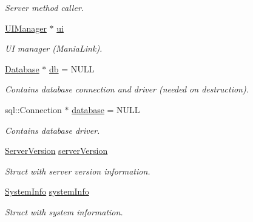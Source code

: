 \begin{DoxyCompactItemize}
\begin{DoxyCompactList}\small\item\em Server method caller. \end{DoxyCompactList}\item 
\hypertarget{classManiaPP_a961146c15f25d19ffc78b3e79ad4abac}{\hyperlink{classUIManager}{U\-I\-Manager} $\ast$ \hyperlink{classManiaPP_a961146c15f25d19ffc78b3e79ad4abac}{ui}}\label{classManiaPP_a961146c15f25d19ffc78b3e79ad4abac}

\begin{DoxyCompactList}\small\item\em U\-I manager (Mania\-Link). \end{DoxyCompactList}\item 
\hypertarget{classManiaPP_a4239002fe32663b70f0f875f41b57cbc}{\hyperlink{classDatabase}{Database} $\ast$ \hyperlink{classManiaPP_a4239002fe32663b70f0f875f41b57cbc}{db} = N\-U\-L\-L}\label{classManiaPP_a4239002fe32663b70f0f875f41b57cbc}

\begin{DoxyCompactList}\small\item\em Contains database connection and driver (needed on destruction). \end{DoxyCompactList}\item 
\hypertarget{classManiaPP_ae2d403d9168ed624d1f877c85b3b38c7}{sql\-::\-Connection $\ast$ \hyperlink{classManiaPP_ae2d403d9168ed624d1f877c85b3b38c7}{database} = N\-U\-L\-L}\label{classManiaPP_ae2d403d9168ed624d1f877c85b3b38c7}

\begin{DoxyCompactList}\small\item\em Contains database driver. \end{DoxyCompactList}\item 
\hypertarget{classManiaPP_ae5cc5086f09dcdb6b5d5dd4cb9a5476c}{\hyperlink{structServerVersion}{Server\-Version} \hyperlink{classManiaPP_ae5cc5086f09dcdb6b5d5dd4cb9a5476c}{server\-Version}}\label{classManiaPP_ae5cc5086f09dcdb6b5d5dd4cb9a5476c}

\begin{DoxyCompactList}\small\item\em Struct with server version information. \end{DoxyCompactList}\item 
\hypertarget{classManiaPP_aa81f571a6c007f2b7cf26101d9c23a3d}{\hyperlink{structSystemInfo}{System\-Info} \hyperlink{classManiaPP_aa81f571a6c007f2b7cf26101d9c23a3d}{system\-Info}}\label{classManiaPP_aa81f571a6c007f2b7cf26101d9c23a3d}

\begin{DoxyCompactList}\small\item\em Struct with system information. \end{DoxyCompactList}\end{DoxyCompactItemize}


